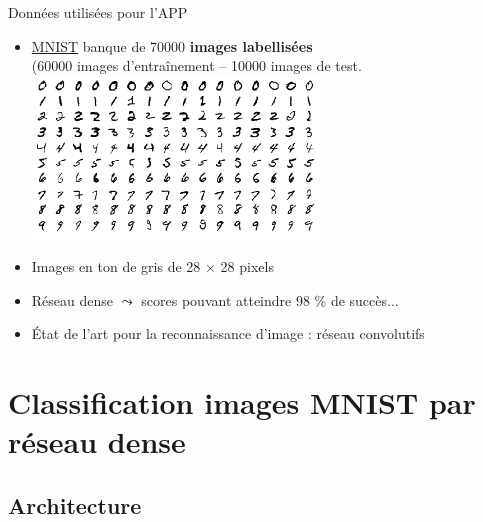 \documentclass[10pt,serif,mathserif,compress,hyperref={colorlinks}]{beamer}
\begin{document}
\begin{frame}{Données utilisées pour l'APP}

  \begin{itemize}
  \item \href{http://yann.lecun.com/exdb/mnist/}{MNIST} banque de 70000 \textbf{images labellisées}\\
    (60000 images d'entraînement -- 10000 images de test.\\[3mm]
    \includegraphics[width=0.6\textwidth]{images/MNIST_digits_sample.png}
  \item Images en ton de gris de 28 $\times$ 28 pixels
  \item Réseau dense $\leadsto$ scores pouvant atteindre 98 \% de succès...
  \item État de l'art pour la reconnaissance d'image : réseau convolutifs
  \end{itemize}       
  
\end{frame}

\section{Classification images MNIST par réseau dense}

\subsection{Architecture}
\end{document}
